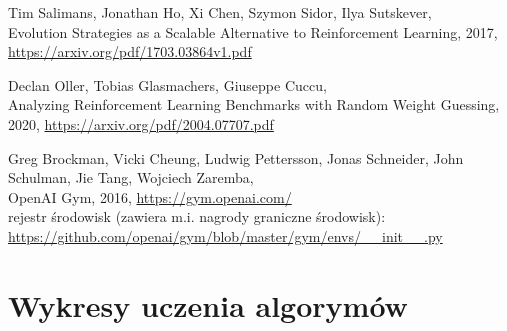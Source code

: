 \documentclass[12pt,a4paper]{article}
\begin{document}
\pagebreak
\begin{thebibliography}{9}
  Tim Salimans, Jonathan Ho, Xi Chen, Szymon Sidor, Ilya Sutskever,\\
  Evolution Strategies as a Scalable Alternative to Reinforcement Learning,
  2017, \href{https://arxiv.org/pdf/1703.03864v1.pdf}{https://arxiv.org/pdf/1703.03864v1.pdf}

  Declan Oller, Tobias Glasmachers, Giuseppe Cuccu, \\
  Analyzing Reinforcement Learning Benchmarks with Random Weight Guessing,
  2020, \href{https://arxiv.org/pdf/2004.07707.pdf}{https://arxiv.org/pdf/2004.07707.pdf}

  Greg Brockman, Vicki Cheung, Ludwig Pettersson, Jonas Schneider, John Schulman, Jie Tang, Wojciech Zaremba,\\
  OpenAI Gym, 2016, \href{https://gym.openai.com/}{https://gym.openai.com/} \\
  rejestr środowisk (zawiera m.i. nagrody graniczne środowisk): \\
  \href{https://github.com/openai/gym/blob/master/gym/envs/\_\_init\_\_.py}{https://github.com/openai/gym/blob/master/gym/envs/\_\_init\_\_.py}

\end{thebibliography}

\pagebreak
\appendix
\section{Wykresy uczenia algorymów}\label{appendix:training}
\end{document}
